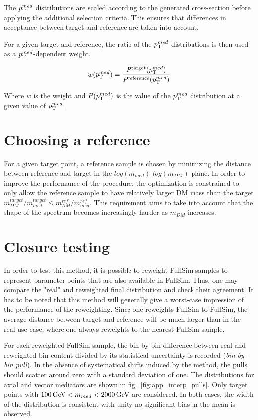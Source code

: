 The $p_{\mathrm{T}}^{med}$ distributions are scaled according to the generated cross-section before applying the additional selection criteria.
This ensures that differences in acceptance between target and reference are taken into account.

For a given target and reference, the ratio of the $p_{\mathrm{T}}^{med}$ distributions is then used as a $p_{\mathrm{T}}^{med}$-dependent weight.

$$ w(p_{\mathrm{T}}^{med}) = \frac{P^{\rm target}(p_{\mathrm{T}}^{med}) }{ P^{\rm reference}(p_{\mathrm{T}}^{med})}$$

Where $w$ is the weight and $P(p_{\mathrm{T}}^{med})$ is the value of the $p_{\mathrm{T}}^{med}$ distribution at a given value of $p_{\mathrm{T}}^{med}$.


\section{Choosing a reference}
For a given target point, a reference sample is chosen by minimizing the distance between reference and target in the $log(m_{med})$-$log(m_{DM})$ plane.
In order to improve the performance of the procedure, the optimization is constrained to only allow the reference sample to have relatively larger
DM mass than the target  $m_{DM}^{target} / m_{med}^{target}  \leq m_{DM}^{ref} / m_{med}^{ref}$. This requirement aims to take
into account that the shape of the \MET spectrum becomes increasingly harder as $m_{DM}$ increases.


\section{Closure testing}
In order to test this method, it is possible to reweight FullSim samples to represent parameter points that are also available in FullSim.
Thus, one may compare the "real" and reweighted final \MET distribution and check their agreement.
It has to be noted that this method will generally give a worst-case impression of the performance of the reweighting.
Since one reweights FullSim to FullSim, the average distance between target and reference will be much larger than in the
real use case, where one always reweights to the nearest FullSim sample.

For each reweighted FullSim sample, the bin-by-bin difference between real and reweighted bin content divided by its statistical uncertainty is recorded
(\textit{bin-by-bin pull}). In the absence of systematical shifts induced by the method, the pulls should scatter around zero with a standard deviation of one.
The distributions for axial and vector mediators are shown in fig.~\ref{fig:app_interp_pulls}. Only target points with $100\,\text{Ge\hspace{-.08em}V} < m_{med} < 2000\,\text{Ge\hspace{-.08em}V}$ are considered.
In both cases, the width of the distribution is consistent with unity no significant bias in the mean is observed.

